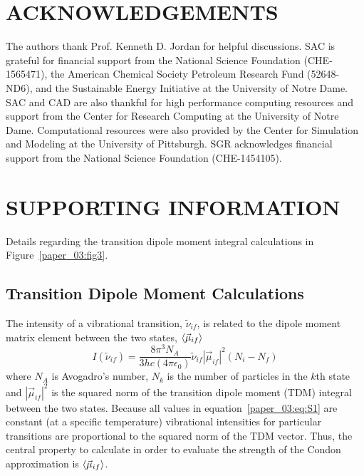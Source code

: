 \documentclass[%
  class = book,%
  crop = false,%
  float = true,%
  multi = true,%
  preview = false,%
]{standalone}
\let\cite\autocite
\newcommand{\caps}[1]{\uppercase{#1}}
\begin{document}
\section{\texorpdfstring{\caps{Acknowledgements}}{Acknowledgements}}

The authors thank Prof. Kenneth D. Jordan for helpful discussions. SAC is grateful for financial support from the National Science Foundation (CHE-1565471), the American Chemical Society Petroleum Research Fund (52648-ND6), and the Sustainable Energy Initiative at the University of Notre Dame. SAC and CAD are also thankful for high performance computing resources and support from the Center for Research Computing at the University of Notre Dame. Computational resources were also provided by the Center for Simulation and Modeling at the University of Pittsburgh. SGR acknowledges financial support from the National Science Foundation (CHE-1454105).

\section{\texorpdfstring{\caps{Supporting Information}}{Supporting Information}}
\label{paper_03:sec:SI}

Details regarding the transition dipole moment integral calculations in Figure~\ref{paper_03:fig3}.

\subsection{Transition Dipole Moment Calculations}

The intensity of a vibrational transition, \(\tilde{\nu}_{if}\), is related to the dipole moment matrix element between the two states, \(\Braket{\vec{\mu}_{if}}\)
\begin{equation}
  \label{paper_03:eq:S1}
  I \left( \tilde{\nu}_{if} \right) = \frac{8\pi^{3}N_{A}}{3hc\left( 4\pi\epsilon_{0} \right)} \tilde{\nu}_{if} \left| \vec{\mu}_{if} \right|^{2} (N_{i} - N_{f})
\end{equation}
where \(N_{A}\) is Avogadro's number, \(N_{k}\) is the number of particles in the \(k\)th state and \(\left| \vec{\mu}_{if} \right|^{2}\) is the squared norm of the transition dipole moment (TDM) integral between the two states.\cite{Carbonniere2010} Because all values in equation~\ref{paper_03:eq:S1} are constant (at a specific temperature) vibrational intensities for particular transitions are proportional to the squared norm of the TDM vector. Thus, the central property to calculate in order to evaluate the strength of the Condon approximation is \(\Braket{\vec{\mu}_{if}}\).
\end{document}
